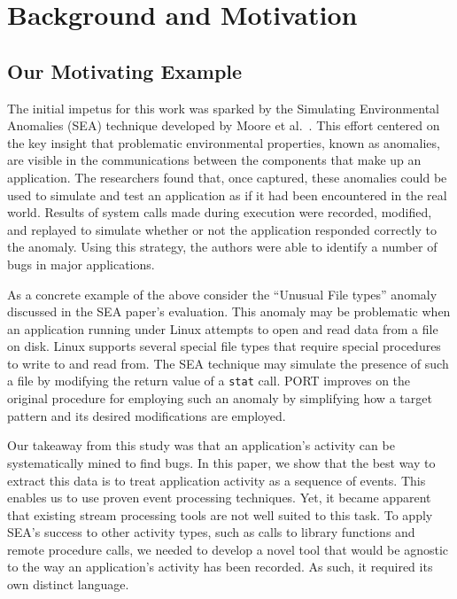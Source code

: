 \section{Background and Motivation}
\label{SEC:background}


\subsection{Our Motivating Example}
\label{sec:MotivatingExample}

The initial impetus for this work was sparked by the Simulating Environmental Anomalies (SEA) technique developed by Moore et al.~\cite{DBLP:conf/issre/MooreCFW19}.
This effort centered on the key insight
that problematic
environmental properties,
known as anomalies, are visible in the
communications between the components that make up an application.
The researchers found that,
once captured,
these anomalies
could be
used to simulate and 
test
an application as if
it had been encountered
in the real world.
Results of system calls made
during execution were recorded, modified, and replayed to simulate whether or not the application
responded correctly to the anomaly.
Using this strategy, the authors were able to identify a number of bugs
in major applications.

As a concrete example of the above
consider the ``Unusual File types'' anomaly
discussed in the SEA paper's evaluation.
This anomaly may be problematic
when an application running under Linux
attempts to open and read data from a file on disk.
Linux supports several special file types  that require special procedures to 
write to and
read from.
The SEA technique
may simulate the presence of such a file by
modifying
the return value
of a {\tt stat} call.
PORT improves on the original procedure for employing such an anomaly
by simplifying how a target pattern
and its desired modifications are employed.

Our takeaway
from this study
was that an application's activity
can be systematically mined to find bugs.
In this paper, we
show that the best way to extract this data
is to treat application activity
as a sequence of events. This enables us to use
proven event processing techniques. 
Yet, it became apparent that existing
stream processing tools
are not well suited to this task. To apply
SEA's success to other activity types,
such as calls to library functions
and remote procedure calls, we needed to develop a novel tool that would be  agnostic to the way an application's activity has been recorded. As such, it required its own  distinct language. 


